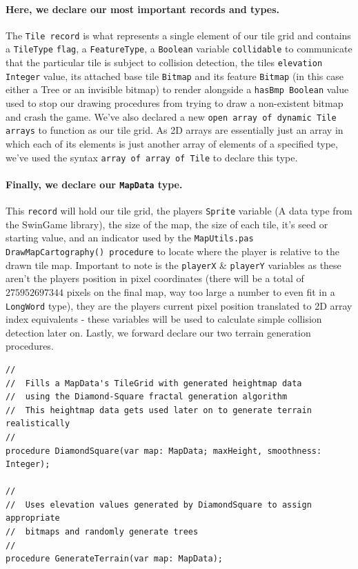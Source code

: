 \documentclass{article}
\begin{document}
\paragraph{Here, we declare our most important records and types.} The \texttt{Tile record} is what represents a single element of our tile grid and contains a \texttt{TileType} \texttt{flag}, a \texttt{FeatureType}, a \texttt{Boolean} variable \texttt{collidable} to communicate that the particular tile is subject to collision detection, the tiles \texttt{elevation Integer} value, its attached base tile \texttt{Bitmap} and its feature \texttt{Bitmap} (in this case either a Tree or an invisible bitmap) to render alongside a \texttt{hasBmp Boolean} value used to stop our drawing procedures from trying to draw a non-existent bitmap and crash the game. We've also declared a new \texttt{open array of dynamic Tile arrays} to function as our tile grid. As 2D arrays are essentially just an array in which each of its elements is just another array of elements of a specified type, we've used the syntax \texttt{array of array of Tile} to declare this type.

\paragraph{Finally, we declare our \texttt{MapData} type.} This \texttt{record} will hold our tile grid, the players \texttt{Sprite} variable (A data type from the SwinGame library), the size of the map, the size of each tile, it's seed or starting value, and an indicator used by the \texttt{MapUtils.pas DrawMapCartography() procedure} to locate where the player is relative to the drawn tile map. Important to note is the \texttt{playerX} \& \texttt{playerY} variables as these aren't the players position in pixel coordinates (there will be a total of $275952697344$ pixels on the final map, way too large a number to even fit in a \texttt{LongWord} type), they are the players current pixel position translated to 2D array index equivalents - these variables will be used to calculate simple collision detection later on. Lastly, we forward declare our two terrain generation procedures.

\begin{verbatim}
//
//	Fills a MapData's TileGrid with generated heightmap data
//	using the Diamond-Square fractal generation algorithm
//	This heightmap data gets used later on to generate terrain realistically
//
procedure DiamondSquare(var map: MapData; maxHeight, smoothness: Integer);
	
//
//	Uses elevation values generated by DiamondSquare to assign appropriate
//	bitmaps and randomly generate trees
//
procedure GenerateTerrain(var map: MapData);
\end{verbatim}
\end{document}
